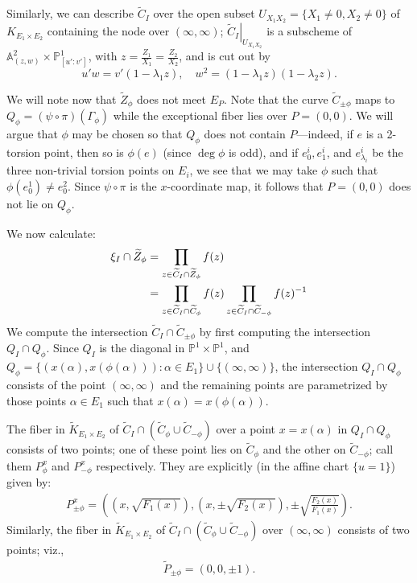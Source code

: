 \documentclass[11pt,a4paper]{article}
\def\deg{\operatorname{deg}}
\begin{document}
Similarly, we can describe $\widetilde{C}_I$ over the open subset $U_{X_1X_2} = \{X_1 \neq 0, X_2 \neq 0\}$ of $K_{E_1 \times E_2}$ containing the node over $(\infty, \infty)$; $\left.\widetilde{C}_I\right|_{U_{X_1X_2}}$ is a subscheme of $\mathbb{A}^2_{(z, w)} \times \mathbb{P}^1_{[u' : v']}$, with $z = \frac{Z_1}{X_1} = \frac{Z_2}{X_2}$, and is cut out by 
\[u'w = v' (1 - \lambda_1z), \quad w^2 = (1  - \lambda_1z)(1 - \lambda_2z).\]



We will note now that $\widetilde{Z}_\phi$ does not meet $E_P$. Note that the curve $\widetilde{C}_{\pm \phi}$ maps to $Q_\phi = (\psi \circ \pi)(\Gamma_\phi)$ while the exceptional fiber lies over $P = (0, 0)$. We will argue that $\phi$ may be chosen so that $Q_\phi$ does not contain $P$---indeed, if $e$ is a 2-torsion point, then so is $\phi(e)$ (since $\deg \phi$ is odd), and
if $e_0^i, e_1^i$, and $e_{\lambda_i}^i$ be the three non-trivial torsion points on $E_i$, we see that we may take $\phi$ such that $\phi(e_0^1) \neq e_0^2$. Since $\psi \circ \pi$ is the $x$-coordinate map, it follows that $P = (0, 0)$ does not lie on $Q_\phi$.

We now calculate:
\begin{align}
 \xi_I \cap \widetilde{Z}_\phi &= \prod_{z \in \widetilde{C}_I \cap \widetilde{Z}_\phi} f(z) \notag \\
  &=  \prod_{z \in \widetilde{C}_I \cap \widetilde{C}_\phi} f(z)  \prod_{z \in \widetilde{C}_I \cap \widetilde{C}_{-\phi}} f(z)^{-1} 
\end{align}
We compute the intersection $\widetilde{C}_I \cap \widetilde{C}_{\pm \phi}$ by first computing the intersection $Q_I \cap Q_\phi$. Since $Q_I$ is the diagonal in $\mathbb{P}^1\times \mathbb{P}^1$, and $Q_\phi = \{(x(\alpha), x(\phi(\alpha))): \alpha \in E_1\} \cup \{(\infty, \infty)\}$, the intersection $Q_I \cap Q_\phi$ consists of the point $(\infty, \infty)$ and the remaining points are parametrized by those points $\alpha \in E_1$ such that $x(\alpha) = x(\phi(\alpha))$.

The fiber in $\widetilde{K}_{E_1 \times E_2}$ of $\widetilde{C}_I \cap (\widetilde{C}_\phi \cup \widetilde{C}_{-\phi})$ over a point $x = x(\alpha)$ in $Q_I \cap Q_\phi$ consists of two points; one of these point lies on $\widetilde{C}_\phi$ and the other on $\widetilde{C}_{-\phi}$; call them $P_\phi^x$ and $P_{-\phi}^{x}$ respectively. They are explicitly (in the affine chart $\{u = 1\}$) given by:
\begin{align*}
  P_{\pm \phi}^x = \left((x, \sqrt{F_1(x)}), (x, \pm\sqrt{F_2(x)}), \pm\sqrt{\frac{F_2(x)}{F_1(x)}}\right). 
\end{align*}
Similarly, the fiber in $\widetilde{K}_{E_1 \times E_2}$ of $\widetilde{C}_I \cap (\widetilde{C}_\phi \cup \widetilde{C}_{-\phi})$ over $(\infty, \infty)$ consists of two points; viz.,  
\begin{align*}
  \widetilde{P}_{\pm \phi} = (0, 0, \pm 1). 
\end{align*}
\end{document}
